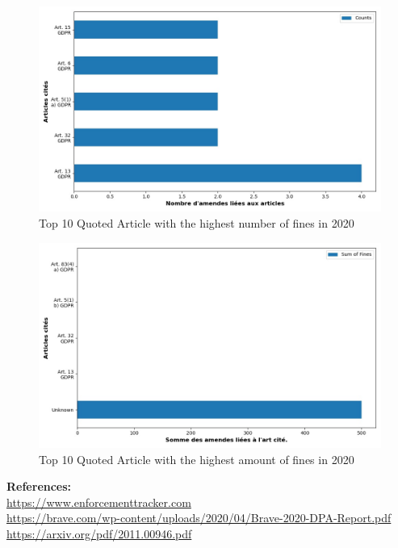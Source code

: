 \documentclass[12pt]{article}
\begin{document}
	\begin{multicols}{2}
	\begin{figure}
		[H]\centering\includegraphics[width=1.0\linewidth]{graphs/top10_quoted_year}
		\caption{Top 10 Quoted Article with the highest number of fines in 2020}
	\end{figure}
	\begin{figure}
		[H]\centering\includegraphics[width=1\linewidth]{graphs/top10_quoted_year_fines}
		\caption{Top 10 Quoted Article with the highest amount of fines in 2020}
	 \end{figure}
	
	\end{multicols}









\vspace*{\fill}
\textbf{References:}\\
\href{https://www.enforcementtracker.com}{https://www.enforcementtracker.com}\\
\href{https://brave.com/wp-content/uploads/2020/04/Brave-2020-DPA-Report.pdf}{https://brave.com/wp-content/uploads/2020/04/Brave-2020-DPA-Report.pdf}\\
\href{https://arxiv.org/pdf/2011.00946.pdf}{https://arxiv.org/pdf/2011.00946.pdf}
\end{document}
